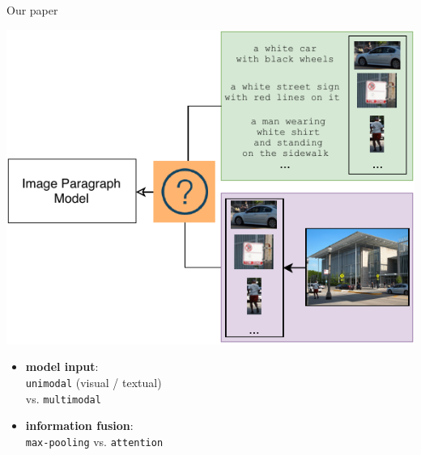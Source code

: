 \documentclass[notes=hide]{beamer}
\begin{document}
\begin{frame}{Our paper}
\small
{}
\begin{minipage}{0.2\textwidth}
\vspace{.5cm}
\includegraphics[width=2.5\textwidth]{hyp}
\end{minipage} \hfill
\begin{minipage}{0.5\textwidth}
\vspace{.5cm}
\begin{itemize}
\item \textbf{model input}:\\ \texttt{unimodal} (visual / textual)\\ vs. \texttt{multimodal}
\pause
\item \textbf{information fusion}:\\ \texttt{max-pooling} vs. \texttt{attention}
\end{itemize}
\end{minipage}
\end{frame}
\end{document}

